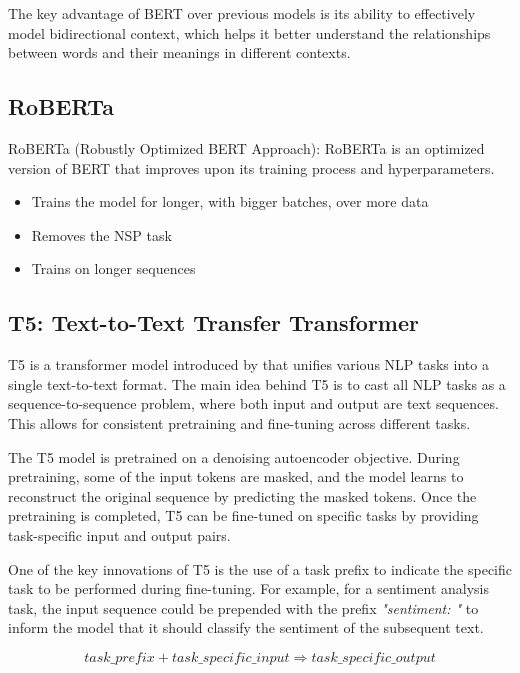 \documentclass[12pt]{article}
\begin{document}
The key advantage of BERT over previous models is its ability to effectively model bidirectional context, which helps it better understand the relationships between words and their meanings in different contexts.

\subsection{RoBERTa}
RoBERTa (Robustly Optimized BERT Approach): RoBERTa is an optimized version of BERT that improves upon its training process and hyperparameters. 

\begin{itemize}
	\item Trains the model for longer, with bigger batches, over more data
	\item Removes the NSP task
	\item Trains on longer sequences
\end{itemize}

\subsection{T5: Text-to-Text Transfer Transformer}
T5 is a transformer model introduced by that unifies various NLP tasks into a single text-to-text format. The main idea behind T5 is to cast all NLP tasks as a sequence-to-sequence problem, where both input and output are text sequences. This allows for consistent pretraining and fine-tuning across different tasks.

The T5 model is pretrained on a denoising autoencoder objective. During pretraining, some of the input tokens are masked, and the model learns to reconstruct the original sequence by predicting the masked tokens. Once the pretraining is completed, T5 can be fine-tuned on specific tasks by providing task-specific input and output pairs.

One of the key innovations of T5 is the use of a task prefix to indicate the specific task to be performed during fine-tuning. For example, for a sentiment analysis task, the input sequence could be prepended with the prefix \textit{"sentiment: "} to inform the model that it should classify the sentiment of the subsequent text.

\begin{equation}
\textit{task\_prefix} + \textit{task\_specific\_input} \Rightarrow \textit{task\_specific\_output}
\end{equation}
\end{document}
